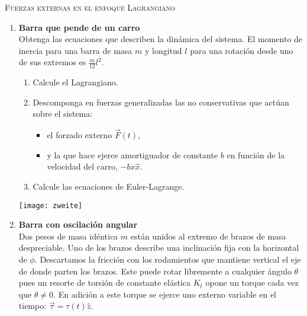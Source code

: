 \documentclass[11pt, spanish, a4paper, twoside]{article}
\begin{document}
\begin{center}
  \textsc{\large Fuerzas externas en el enfoque Lagrangiano}
\end{center}

\begin{enumerate}

\item 
\begin{minipage}[t][6.5cm]{0.55\textwidth}
\textbf{Barra que pende de un carro}\\
Obtenga las ecuaciones que describen la dinámica del sistema.
El momento de inercia para una barra de masa \(m\) y longitud \(l\) para una rotación desde uno de sus extremos es \(\frac{m}{12} l^2\). 
\begin{enumerate}
	\item Calcule el Lagrangiano.
	\item Descomponga en fuerzas generalizadas las no conservativas que actúan sobre el sistema:
	\begin{itemize}
		\item el forzado externo \(\vec{F}(t)\),
		\item y la que hace ejerce amortiguador de constante \(b\) en función de la velocidad del carro,  \(- b \dot{x} \hat{x}\).
	\end{itemize}
	\item Calcule las ecuaciones de Euler-Lagrange. 
\end{enumerate}
\end{minipage}
\begin{minipage}[c][0cm][t]{0.4\textwidth}
	\texttt{[image: zweite]}
\end{minipage}




\item 
\begin{minipage}[t][6cm]{0.6\textwidth}
\textbf{Barra con oscilación angular}\\
Dos pesos de masa idéntica $m$ están unidos al extremo de brazos de masa despreciable.
Uno de los brazos describe una inclinación fija con la horizontal de $\phi$.
Descartamos la fricción con los rodamientos que mantiene vertical el eje de donde parten los brazos.
Este puede rotar libremente a cualquier ángulo $\theta$ pues un resorte de torsión de constante elástica $K_t$ opone un torque cada vez que $\theta \neq 0$.
En adición a este torque se ejerce uno externo variable en el tiempo: $\vec{\tau}= \tau (t) \hat{z}$.


\end{minipage}
\end{enumerate}
\end{document}
